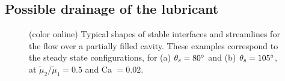 \subsection{Possible drainage of the lubricant}

\begin{figure}[t]
  \centering


  \caption{(color online) Typical shapes of stable interfaces and streamlines for the flow over a partially filled cavity. These examples correspond to the steady state configurations, for (a) $\theta_s=80\degree$ and (b) $\theta_s=105\degree$, at $\tilde{\mu}_2/\tilde{\mu}_1=0.5$ and Ca $=0.02$.}
  \label{fig: shape}
\end{figure}

